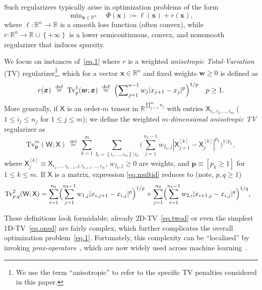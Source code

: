 \documentclass[twoside,11pt]{article}
\newcommand{\vp}{\bm{p}}       \newcommand{\vph}{\hat{\bm{p}}}        \newcommand{\ph}{\hat{p}}    \newcommand{\vpt}{\tilde{\bm{p}}}       \newcommand{\pt}{\tilde{p}}
\newcommand{\vw}{\bm{w}}       \newcommand{\vwh}{\hat{\bm{w}}}        \newcommand{\wh}{\hat{w}}    \newcommand{\vwt}{\tilde{\bm{w}}}       \newcommand{\wt}{\tilde{w}}
\newcommand{\vx}{\bm{x}}       \newcommand{\vxh}{\hat{\bm{x}}}        \newcommand{\xh}{\hat{x}}    \newcommand{\vxt}{\tilde{\bm{x}}}       \newcommand{\xt}{\tilde{x}}
\newcommand{\tx}{\mathsf{X}}
\newcommand{\tw}{\mathsf{W}}
\newcommand{\set}[1]{\left\{ {#1}\right\}}
\newcommand{\nlsum}{\sum\nolimits}
\newcommand{\nlmin}{\min\nolimits}
\newcommand{\defeq}{\ \stackrel{\text{def}}{=}\ }
\newcommand{\reals}{\mathbb{R}}
\newcommand{\sml}[1]{{\small #1}}
\newcommand{\fromto}[3]{\sml{$#1 \le #2 \le #3$}}
\newcommand{\tvell}{\text{Tv}}
\numberwithin{equation}{section}
\numberwithin{theorem}{section}
\begin{document}
Such regularizers typically arise in optimization problems of the form
\begin{equation}
  \label{eq.1}
  \nlmin_{\vx \in \reals^n}\quad \Phi(\vx) := \ell(\vx) + r(\vx),
\end{equation}
where $\ell: \reals^n \to \reals$ is a smooth loss function (often convex), while  $r: \reals^n \to \reals \cup \set{+\infty}$ is a lower semicontinuous, convex, and nonsmooth regularizer that induces sparsity.

We focus on instances of~\eqref{eq.1} where $r$ is a weighted \emph{anisotropic Total-Variation} (TV) regularizer\footnote{We use the term ``anisotropic'' to refer to the specific TV penalties considered in this paper.}, which for a vector $\vx \in \reals^n$ and fixed weights $\vw \ge 0$ is defined as
\begin{equation}
  \label{eq.oned}
  r(\vx) \defeq \tvell_p^{1}(\vw;\vx) \defeq \Bigl(\nlsum_{j=1}^{n-1}w_j |x_{j+1}-x_j|^p\Bigr)^{1/p}
  \quad p \ge 1.
\end{equation}
More generally, if $\tx$ is an order-$m$ tensor in $\reals^{\prod_{j=1}^m n_j}$ with entries $\tx_{i_1,i_2,\ldots,i_m}$ (\fromto{1}{i_j}{n_j} for \fromto{1}{j}{m}); we define the weighted \emph{$m$-dimensional anisotropic TV} regularizer as
\begin{equation}
  \label{eq.multid}
  \tvell^m_{\vp}(\tw; \tx) \defeq \sum_{k=1}^m \sum_{I_{k} = \set{i_1,\ldots,i_m} \setminus i_k}\biggl(\sum_{j=1}^{n_k-1}w_{I_k,j}|\tx^{[k]}_{j+1}-\tx^{[k]}_{j}|^{p_k}\biggr)^{1/p_k},
\end{equation}
where $\tx^{[k]}_j \equiv \tx_{i_1,\ldots,i_{k-1},j,i_{k+1},\ldots,i_m}$, $w_{I_k,j} \ge 0$ are weights, and $\vp \equiv [p_k \ge 1]$ for \fromto{1}{k}{m}. If $\tx$ is a matrix, expression \eqref{eq.multid} reduces to (note, $p, q \ge 1$)
\begin{equation}
  \label{eq.twod}
  \begin{split}
    \tvell_{p,q}^{2}(\tw; \tx) &=
    \sum_{i=1}^{n_1}\Bigl(\sum_{j=1}^{n_2-1}w_{1,j}|x_{i,j+1}-x_{i,j}|^p\Bigr)^{1/p}
    + \sum_{j=1}^{n_2}\Bigl(\sum_{i=1}^{n_1-1}w_{2,i}|x_{i+1,j}-x_{i,j}|^q\Bigr)^{1/q},
  \end{split}
\end{equation}

These definitions look formidable; already  2D-TV~\eqref{eq.twod} or even the simplest 1D-TV~\eqref{eq.oned} are fairly complex, which further complicates the overall optimization problem~\eqref{eq.1}. Fortunately, this complexity can be ``localized'' by invoking \emph{prox-operators}~\citep{moreau62}, which are now widely used across machine learning~\citep{sraBook,parikh2014proximal}.
\end{document}

